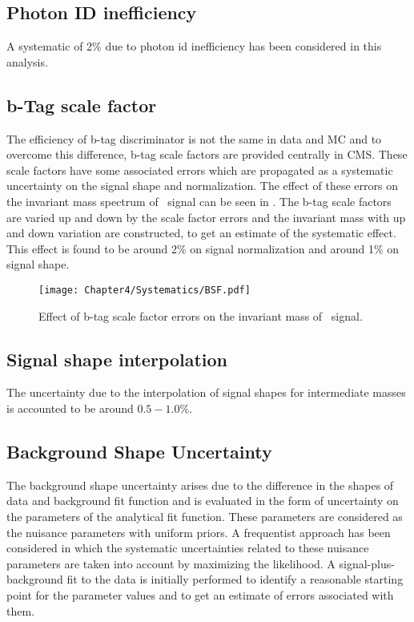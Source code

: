 \subsection{Photon ID inefficiency}
A systematic of 2$\%$ due to photon id inefficiency has been considered in this analysis. 
\subsection{b-Tag scale factor}
The efficiency of b-tag discriminator is not the same in data and MC and to overcome this difference, b-tag scale factors are provided centrally in CMS.
These scale factors have some associated errors which are propagated as a systematic uncertainty on the signal shape
and normalization. The effect of these errors on the invariant mass spectrum of \bstar\ signal can be seen in \fig{\ref{fig:BSFsys}}. 
The b-tag scale factors are varied up and down by the scale factor errors and the invariant mass with up and down variation are constructed,
to get an estimate of the systematic effect. This effect is found to be around 2$\%$ on signal normalization and around 1$\%$ on signal shape.
\begin{figure}[htbp]
\centering
\texttt{[image: Chapter4/Systematics/BSF.pdf]}
\caption{Effect of b-tag scale factor errors on the invariant mass of \bstar\ signal.}
\label{fig:BSFsys}
\end{figure}
\subsection{Signal shape interpolation}
The uncertainty due to the interpolation of signal shapes for intermediate masses is accounted to be around $0.5-1.0\%$.
\subsection{Background Shape Uncertainty}
The background shape uncertainty arises due to the difference in the shapes of data and background fit function and is evaluated in the form of 
uncertainty on the parameters of the analytical fit function.
These parameters are considered as the nuisance parameters with uniform priors. 
A frequentist approach has been considered in which the systematic uncertainties related to these nuisance parameters are taken into account 
by maximizing the likelihood. A signal-plus-background fit to the data is initially performed to identify a reasonable 
starting point for the parameter values and to get an estimate of errors associated with them.

